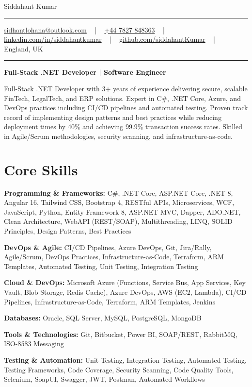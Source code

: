 \documentclass[letterpaper,10pt]{article}
\newcommand{\documentTitle}[2]{
  \begin{center}
    \vspace*{-0.3in}
    {\Huge\color{accentTitle} #1}
    \vspace{8pt}
    {\color{accentLine} \hrule}
    \vspace{2pt}
    \footnotesize{#2}
    \vspace{2pt}
    {\color{accentLine} \hrule}
  \end{center}
}
\newenvironment{resume_list}{
  \vspace{-7pt}
  \begin{itemize}[itemsep=-2px, parsep=1pt, leftmargin=30pt]
}{
  \end{itemize}
}
\begin{document}
\documentTitle{Siddahant Kumar}{
\vspace{0.1cm}
\href{mailto:sidhantlohana@outlook.com}{sidhantlohana@outlook.com} ~ | ~
\href{tel:+447827848363}{+44 7827 848363} ~ | ~
\href{https://www.linkedin.com/in/siddahantkumar/}{linkedin.com/in/siddahantkumar} ~ | ~
\href{https://github.com/siddahantKumar}{github.com/siddahantKumar} ~ | ~
England, UK
}

\begin{center}
\textbf{Full-Stack .NET Developer | Software Engineer}
\end{center}

Full-Stack .NET Developer with 3+ years of experience delivering secure, scalable FinTech, LegalTech, and ERP solutions. Expert in C\#, .NET Core, Azure, and DevOps practices including CI/CD pipelines and automated testing. Proven track record of implementing design patterns and best practices while reducing deployment times by 40\% and achieving 99.9\% transaction success rates. Skilled in Agile/Scrum methodologies, security scanning, and infrastructure-as-code.


\section{Core Skills}

\begin{resume_list}
    \item \textbf{Programming \& Frameworks:} C\#, .NET Core, ASP.NET Core, .NET 8, Angular 16, Tailwind CSS, Bootstrap 4, RESTful APIs, Microservices, WCF, JavaScript, Python, Entity Framework 8, ASP.NET MVC, Dapper, ADO.NET, Clean Architecture, WebAPI (REST/SOAP), Multithreading, LINQ, SOLID Principles, Design Patterns, Best Practices
    \item \textbf{DevOps \& Agile:} CI/CD Pipelines, Azure DevOps, Git, Jira/Rally, Agile/Scrum, DevOps Practices, Infrastructure-as-Code, Terraform, ARM Templates, Automated Testing, Unit Testing, Integration Testing
    \item \textbf{Cloud \& DevOps:} Microsoft Azure (Functions, Service Bus, App Services, Key Vault, Blob Storage, Redis Cache), Azure DevOps, AWS (EC2, Lambda), CI/CD Pipelines, Infrastructure-as-Code, Terraform, ARM Templates, Jenkins
    \item \textbf{Databases:} Oracle, SQL Server, MySQL, PostgreSQL, MongoDB
    \item \textbf{Tools \& Technologies:} Git, Bitbucket, Power BI, SOAP/REST, RabbitMQ, ISO-8583 Messaging
    \item \textbf{Testing \& Automation:} Unit Testing, Integration Testing, Automated Testing, Testing Frameworks, Code Coverage, Security Scanning, Code Quality Tools, Selenium, SoapUI, Swagger, JWT, Postman, Automated Workflows
\end{resume_list}
\end{document}
